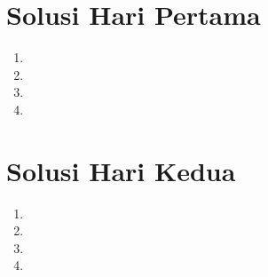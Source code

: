 \section{Solusi Hari Pertama}
\begin{enumerate}
    \item 
    \newpage
    \item 
    \newpage
    \item 
    \newpage
    \item 
    \newpage
\end{enumerate}

\section{Solusi Hari Kedua}
\begin{enumerate}[resume]
    \item 
    \newpage
    \item 
    \newpage
    \item 
    \newpage
    \item 
\end{enumerate}